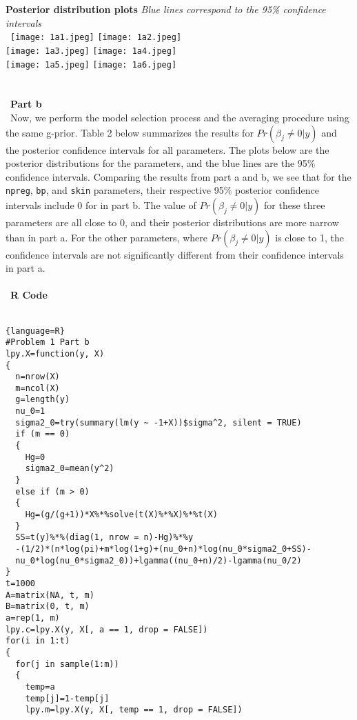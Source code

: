 \documentclass[12pt]{article}
\newenvironment{problem}[2][Problem]{\begin{trivlist}
\item[\hskip \labelsep {\bfseries #1}\hskip \labelsep {\bfseries #2.}]}{\end{trivlist}}
\begin{document}
\begin{problem}{1}
\textbf{Posterior distribution plots} \textit{Blue lines correspond to the 95\% confidence intervals}
\\\
\texttt{[image: 1a1.jpeg]}
\texttt{[image: 1a2.jpeg]}\\
\texttt{[image: 1a3.jpeg]}
\texttt{[image: 1a4.jpeg]}\\
\texttt{[image: 1a5.jpeg]}
\texttt{[image: 1a6.jpeg]}\\
\\
\\\
\textbf{Part b}
\\\
Now, we perform the model selection process and the averaging procedure using the same g-prior. Table 2 below summarizes the results for $Pr(\beta_j\neq0|y)$ and the posterior confidence intervals for all parameters. The plots below are the posterior distributions for the parameters, and the blue lines are the 95\% confidence intervals. Comparing the results from part a and b, we see that for the \texttt{npreg}, \texttt{bp}, and \texttt{skin} parameters, their respective 95\% posterior confidence intervals include 0 for in part b. The value of $Pr(\beta_j\neq0|y)$ for these three parameters are all close to 0, and their posterior distributions are more narrow than in part a. For the other parameters, where $Pr(\beta_j\neq0|y)$ is close to 1, the confidence intervals are not significantly different from their confidence intervals in part a. \\
\\\
\textbf{R Code} 
\\\
\begin{lstlisting}{language=R}
#Problem 1 Part b
lpy.X=function(y, X) 
{
  n=nrow(X)
  m=ncol(X)
  g=length(y)
  nu_0=1
  sigma2_0=try(summary(lm(y ~ -1+X))$sigma^2, silent = TRUE)
  if (m == 0) 
  {
    Hg=0
    sigma2_0=mean(y^2)
  }
  else if (m > 0) 
  {
    Hg=(g/(g+1))*X%*%solve(t(X)%*%X)%*%t(X)
  }
  SS=t(y)%*%(diag(1, nrow = n)-Hg)%*%y
  -(1/2)*(n*log(pi)+m*log(1+g)+(nu_0+n)*log(nu_0*sigma2_0+SS)-
  nu_0*log(nu_0*sigma2_0))+lgamma((nu_0+n)/2)-lgamma(nu_0/2)
}
t=1000
A=matrix(NA, t, m)
B=matrix(0, t, m)
a=rep(1, m)
lpy.c=lpy.X(y, X[, a == 1, drop = FALSE])
for(i in 1:t) 
{
  for(j in sample(1:m)) 
  {
    temp=a
    temp[j]=1-temp[j]
    lpy.m=lpy.X(y, X[, temp == 1, drop = FALSE])

\end{lstlisting}
\end{problem}
\end{document}
